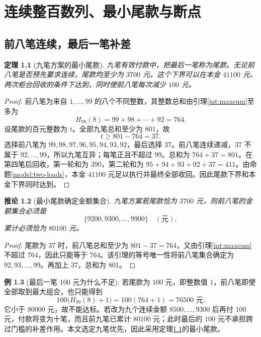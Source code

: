 \documentclass[UTF8,a4paper]{ctexbook}
\newtheorem{theorem}{定理}[chapter]
\newtheorem{corollary}[theorem]{推论}
\theoremstyle{definition}
\newtheorem{example}[theorem]{例}
\numberwithin{equation}{chapter}
\newcommand{\1}{\mathbf{1}}
\begin{document}
\chapter{连续整百数列、最小尾款与断点}\label{seq:chapter}

\section{前八笔连续，最后一笔补差}
\begin{theorem}[九笔方案的最小尾款]\label{seq:tail}
九笔有效付款中，把最后一笔称为尾款。无论前八笔是否预先要求连续，尾款均至少为 $3700$ 元。这个下界可以在本金 $41100$ 元、两次柜台回收的条件下达到，同时使前八笔每次减少 $100$ 元。
\end{theorem}
\begin{proof}
前八笔为来自 $1,\ldots,99$ 的八个不同整数，其整数总和由引理\ref{int:maxsum}至多为
\[
H_{99}(8)=99+98+\cdots+92=764.
\]
设尾款的百元整数为 $t$。全部九笔总和至少为 $801$，故
\[
t\ge801-764=37.
\]
选择前八笔为 $99,98,97,96,95,94,93,92$，最后选择 $37$。前八笔连续递减，$37$ 不属于 $92,\ldots,99$，所以九笔互异；每笔正且不超过 $99$。总和为 $764+37=801$。在第四笔后回收，第一轮和为 $390$，第二轮和为 $95+94+93+92+37=411$。由命题\ref{model:two-loads}，本金 $41100$ 元足以执行并最终全部收回。因此尾款下界和本金下界同时达到。
\end{proof}

\begin{corollary}[最小尾款确定金额集合]\label{seq:tail-unique}
九笔方案若尾款恰为 $3700$ 元，则前八笔的金额集合必须是
\[
\{9200,9300,\ldots,9900\}\quad(\text{元}),
\]
累计必须恰为 $80100$ 元。
\end{corollary}
\begin{proof}
尾款为 $37$ 时，前八笔总和至少为 $801-37=764$，又由引理\ref{int:maxsum}不超过 $764$，因此只能等于 $764$。该引理的等号唯一性将前八笔集合确定为 $92,93,\ldots,99$。再加上 $37$，总和为 $801$。
\end{proof}

\begin{example}[最后一笔 $100$ 元为什么不足]
若尾款为 $100$ 元，即整数值 $1$，前八笔即使全部取到最大组合，也只能得到
\[
100\bigl(H_{99}(8)+1\bigr)=100(764+1)=76500\text{ 元}.
\]
它小于 $80000$ 元，故不能达标。若改为九个连续金额 $8500,\ldots,9300$ 后再付 $100$ 元，付款将变为十笔，而且前九笔已累计 $80100$ 元；此时最后的 $100$ 元不承担跨过门槛的补差作用。本文选定九笔优先，因此采用定理\ref{seq:tail}的最小尾款。
\end{example}
\end{document}
